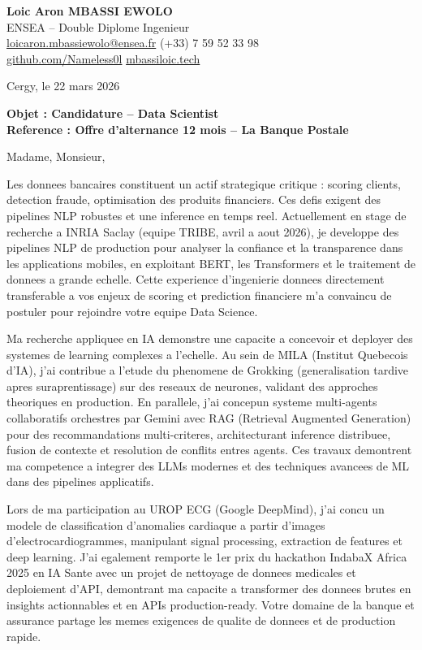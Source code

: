\documentclass[a4paper,11pt]{article}
\begin{document}
\noindent
\textbf{Loic Aron MBASSI EWOLO} \\
ENSEA -- Double Diplome Ingenieur \\
\href{mailto:loicaron.mbassiewolo@ensea.fr}{loicaron.mbassiewolo@ensea.fr} \quad (+33) 7 59 52 33 98 \\
\href{https://github.com/Nameless0l}{github.com/Nameless0l} \quad \href{https://mbassiloic.tech}{mbassiloic.tech}

\vspace{1em}
\noindent
Cergy, le 22 mars 2026

\vspace{1em}
\noindent
\textbf{Objet : Candidature -- Data Scientist} \\
\textbf{Reference : Offre d'alternance 12 mois -- La Banque Postale}

\vspace{1.5em}
\noindent Madame, Monsieur,

Les donnees bancaires constituent un actif strategique critique : scoring clients, detection fraude, optimisation des produits financiers. Ces defis exigent des pipelines NLP robustes et une inference en temps reel. Actuellement en stage de recherche a INRIA Saclay (equipe TRIBE, avril a aout 2026), je developpe des pipelines NLP de production pour analyser la confiance et la transparence dans les applications mobiles, en exploitant BERT, les Transformers et le traitement de donnees a grande echelle. Cette experience d'ingenierie donnees directement transferable a vos enjeux de scoring et prediction financiere m'a convaincu de postuler pour rejoindre votre equipe Data Science.

Ma recherche appliquee en IA demonstre une capacite a concevoir et deployer des systemes de learning complexes a l'echelle. Au sein de MILA (Institut Quebecois d'IA), j'ai contribue a l'etude du phenomene de Grokking (generalisation tardive apres suraprentissage) sur des reseaux de neurones, validant des approches theoriques en production. En parallele, j'ai concepun systeme multi-agents collaboratifs orchestres par Gemini avec RAG (Retrieval Augmented Generation) pour des recommandations multi-criteres, architecturant inference distribuee, fusion de contexte et resolution de conflits entres agents. Ces travaux demontrent ma competence a integrer des LLMs modernes et des techniques avancees de ML dans des pipelines applicatifs.

Lors de ma participation au UROP ECG (Google DeepMind), j'ai concu un modele de classification d'anomalies cardiaque a partir d'images d'electrocardiogrammes, manipulant signal processing, extraction de features et deep learning. J'ai egalement remporte le 1er prix du hackathon IndabaX Africa 2025 en IA Sante avec un projet de nettoyage de donnees medicales et deploiement d'API, demontrant ma capacite a transformer des donnees brutes en insights actionnables et en APIs production-ready. Votre domaine de la banque et assurance partage les memes exigences de qualite de donnees et de production rapide.
\end{document}
